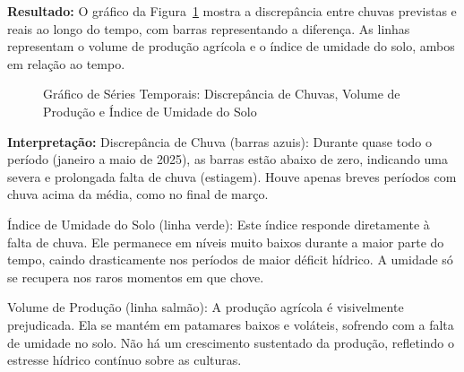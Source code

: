 \documentclass[12pt, a4paper, onecolumn]{article}
\begin{document}
    \vspace{0.5cm}

    \textbf{Resultado:} O gráfico da Figura~\ref{fig:serie_temporal_discrepancia_chuvas} mostra a discrepância entre chuvas previstas e reais ao longo do tempo, com barras representando a diferença. As linhas representam o volume de produção agrícola e o índice de umidade do solo, ambos em relação ao tempo.
    \vspace{0.5cm}

    \begin{figure}[htbp]
        \centering
        \caption{Gráfico de Séries Temporais: Discrepância de Chuvas, Volume de Produção e Índice de Umidade do Solo}
        \label{fig:serie_temporal_discrepancia_chuvas}
    \end{figure}

    \textbf{Interpretação:}
    Discrepância de Chuva (barras azuis): Durante quase todo o período (janeiro a maio de 2025), as barras estão abaixo de zero, indicando uma severa e prolongada falta de chuva (estiagem). Houve apenas breves períodos com chuva acima da média, como no final de março.

    Índice de Umidade do Solo (linha verde): Este índice responde diretamente à falta de chuva. Ele permanece em níveis muito baixos durante a maior parte do tempo, caindo drasticamente nos períodos de maior déficit hídrico. A umidade só se recupera nos raros momentos em que chove.

    Volume de Produção (linha salmão): A produção agrícola é visivelmente prejudicada. Ela se mantém em patamares baixos e voláteis, sofrendo com a falta de umidade no solo. Não há um crescimento sustentado da produção, refletindo o estresse hídrico contínuo sobre as culturas.
    \vspace{0.5cm}
\end{document}
